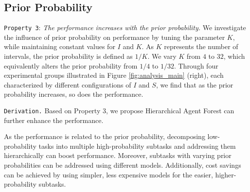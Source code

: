 

\subsection{Prior Probability}

\texttt{Property 3}: \textit{The performance increases with the prior probability.} We investigate the influence of prior probability on performance by tuning the parameter $K$, while maintaining constant values for $I$ and $K$. As $K$ represents the number of intervals, the prior probability is defined as $1/K$. We vary $K$ from $4$ to $32$, which equivalently alters the prior probability from $1/4$ to $1/32$. Through four experimental groups illustrated in Figure \ref{fig:analysis_main} (right), each characterized by different configurations of $I$ and $S$, we find that as the prior probability increases, so does the performance.



\texttt{Derivation.}
Based on Property 3, we propose Hierarchical Agent Forest can further enhance the performance. 

As the performance is related to the prior probability, decomposing low-probability tasks into multiple high-probability subtasks and addressing them hierarchically can boost performance. Moreover, subtasks with varying prior probabilities can be addressed using different models. Additionally, cost savings can be achieved by using simpler, less expensive models for the easier, higher-probability subtasks.

